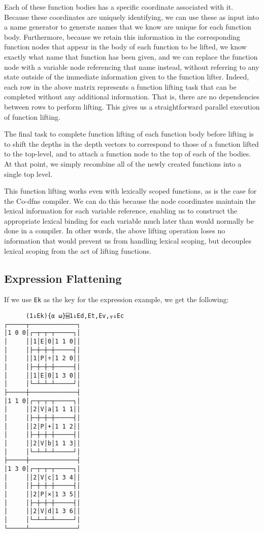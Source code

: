 \documentclass[numbers,preprint]{sigplanconf}
\begin{document}
Each of these function bodies has a specific coordinate associated
with it. Because these coordinates are uniquely identifying, we can
use these as input into a name generator to generate names that we
know are unique for each function body. Furthermore, because we
retain this information in the corresponding function nodes that
appear in the body of each function to be lifted, we know exactly
what name that function has been given, and we can replace the
function node with a variable node referencing that name instead,
without referring to any state outside of the immediate information
given to the function lifter. Indeed, each row in the above matrix
represents a function lifting task that can be completed without any
additional information. That is, there are no dependencies between
rows to perform lifting. This gives us a straightforward parallel
execution of function lifting.

The final task to complete function lifting of each function
body before lifting is to shift the depths in the depth vectors
to correspond to those of a function lifted to the top-level, and
to attach a function node to the top of each of the bodies. At that
point, we simply recombine all of the newly created functions into
a single top level.

This function lifting works even with lexically scoped functions, 
as is the case for the Co-dfns compiler.
We can do this because the node coordinates maintain the lexical information 
for each variable reference, enabling us to construct the appropriate lexical 
binding for each variable much later than would normally be done in a 
compiler. 
In other words, the above lifting operation loses no information that would 
prevent us from handling lexical scoping, but decouples lexical scoping 
from the act of lifting functions.

\subsection{Expression Flattening}

If we use \verb;Ek; as the key for the expression example, we get the
following:

\begin{verbatim}
      (1↓Ek){⍺ ⍵}⌸1↓Ed,Et,Ev,⍪↓Ec
┌─────┬─────────────┐
│1 0 0│┌─┬─┬─┬─────┐│
│     ││1│E│0│1 1 0││
│     │├─┼─┼─┼─────┤│
│     ││1│P│÷│1 2 0││
│     │├─┼─┼─┼─────┤│
│     ││1│E│0│1 3 0││
│     │└─┴─┴─┴─────┘│
├─────┼─────────────┤
│1 1 0│┌─┬─┬─┬─────┐│
│     ││2│V│a│1 1 1││
│     │├─┼─┼─┼─────┤│
│     ││2│P│+│1 1 2││
│     │├─┼─┼─┼─────┤│
│     ││2│V│b│1 1 3││
│     │└─┴─┴─┴─────┘│
├─────┼─────────────┤
│1 3 0│┌─┬─┬─┬─────┐│
│     ││2│V│c│1 3 4││
│     │├─┼─┼─┼─────┤│
│     ││2│P│×│1 3 5││
│     │├─┼─┼─┼─────┤│
│     ││2│V│d│1 3 6││
│     │└─┴─┴─┴─────┘│
└─────┴─────────────┘
\end{verbatim}
\end{document}
